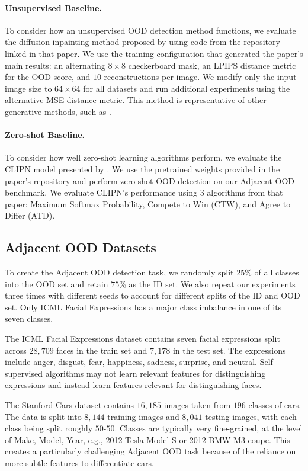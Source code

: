 \paragraph{Unsupervised Baseline.}
To consider how an unsupervised OOD detection method functions, we evaluate the diffusion-inpainting method proposed by \citet{liu2023unsupervised} using code from the repository linked in that paper. We use the training configuration that generated the paper's main results: an alternating $8 \times 8$ checkerboard mask, an LPIPS distance metric for the OOD score, and $10$ reconstructions per image. We modify only the input image size to $64\times64$ for all datasets and run additional experiments using the alternative MSE distance metric. This method is representative of other generative methods, such as \citet{xiao2020likelihood}.

\paragraph{Zero-shot Baseline.}
To consider how well zero-shot learning algorithms perform, we evaluate the CLIPN model presented by \citet{wang2023clipn}. We use the pretrained weights provided in the paper's repository and perform zero-shot OOD detection on our Adjacent OOD benchmark. We evaluate CLIPN's performance using $3$ algorithms from that paper: Maximum Softmax Probability, Compete to Win (CTW), and Agree to Differ (ATD).

\subsection{Adjacent OOD Datasets}

To create the Adjacent OOD detection task, we randomly split $25$\% of all classes into the OOD set and retain $75$\% as the ID set. We also repeat our experiments three times with different seeds to account for different splits of the ID and OOD set. Only ICML Facial Expressions has a major class imbalance in one of its seven classes.

The ICML Facial Expressions dataset \citep{icmlface} contains seven facial expressions split across $28,709$ faces in the train set and $7,178$ in the test set. The expressions include anger, disgust, fear, happiness, sadness, surprise, and neutral. Self-supervised algorithms may not learn relevant features for distinguishing expressions and instead learn features relevant for distinguishing faces.

The Stanford Cars dataset \citep{KrauseStarkDengFei-Fei_3DRR2013} contains $16,185$ images taken from $196$ classes of cars. The data is split into $8,144$ training images and $8,041$ testing images, with each class being split roughly $50$-$50$. Classes are typically very fine-grained, at the level of Make, Model, Year, e.g., 2012 Tesla Model S or 2012 BMW M3 coupe. This creates a particularly challenging Adjacent OOD task because of the reliance on more subtle features to differentiate cars.

